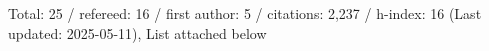 Total: 25 / refereed: 16 / first author: 5 / citations: 2,237 / h-index: 16 (Last updated: 2025-05-11), List attached below